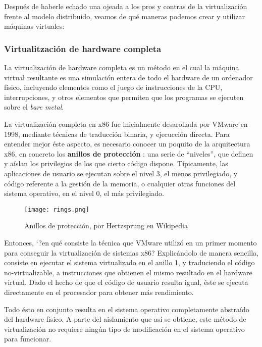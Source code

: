 Después de haberle echado una ojeada a los pros y contras de la virtualización frente al modelo distribuido, veamos de qué maneras podemos crear y utilizar máquinas virtuales:

\subsubsection{Virtualitzación de hardware completa}
\label{subsubsubsec:virt_complete}

La virtualización de hardware completa es un método en el cual la máquina virtual resultante es una simulación entera de todo el hardware de un ordenador físico, incluyendo elementos como el juego de instrucciones de la CPU, interrupciones, y otros elementos que permiten que los programas se ejecuten sobre el \emph{bare metal}.

La virtualización completa en x86 fue inicialmente desarollada por VMware en 1998, mediante técnicas de traducción binaria, y ejecucción directa. Para entender mejor éste aspecto, es necesario conocer un poquito de la arquitectura x86, en concreto los \textbf{anillos de protección} \cite{vmware}: una serie de ``niveles'', que definen y aíslan los privilegios de los que cierto código dispone. Típicamente, las aplicaciones de usuario se ejecutan sobre el nivel 3, el menos privilegiado, y código referente a la gestión de la memoria, o cualquier otras funciones del sistema operativo, en el nivel 0, el más privilegiado.

\clearpage
\begin{figure}[ht]
  \centering
  \texttt{[image: rings.png]}
  \caption{\label{fig:label} Anillos de protección, por Hertzsprung en Wikipedia}
\end{figure}
\vspace{1cm}

Entonces, `?en qué consiste la técnica que VMware utilizó en un primer momento para conseguir la virtualización de sistemas x86? Explicándolo de manera sencilla, consiste en ejecutar el sistema virtualizado en el anillo 1, y traduciendo el código no-virtualizable, a instrucciones que obtienen el mismo resultado en el hardware virtual. Dado el hecho de que el código de usuario resulta igual, éste se ejecuta directamente en el procesador para obtener más rendimiento.

Todo ésto en conjunto resulta en el sistema operativo completamente abstraído del hardware físico. A parte del aislamiento que así se obtiene, este método de virtualización no requiere ningún tipo de modificación en el sistema operativo para funcionar.

